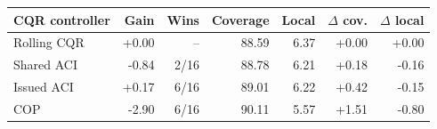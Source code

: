 \begin{tabular}{lrrrrrr}
\toprule
CQR controller & Gain & Wins & Coverage & Local & $\Delta$ cov. & $\Delta$ local \\
\midrule
Rolling CQR & +0.00 & -- & 88.59 & 6.37 & +0.00 & +0.00 \\
Shared ACI & -0.84 & 2/16 & 88.78 & 6.21 & +0.18 & -0.16 \\
Issued ACI & +0.17 & 6/16 & 89.01 & 6.22 & +0.42 & -0.15 \\
COP & -2.90 & 6/16 & 90.11 & 5.57 & +1.51 & -0.80 \\
\bottomrule
\end{tabular}
